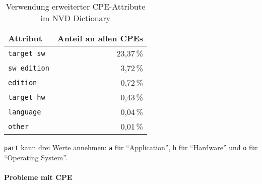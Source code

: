 \begin{table}[h]
    \centering
    \begin{tabular}{lr}
        \toprule
        \textbf{Attribut}   & \textbf{Anteil an allen CPEs} \\
        \midrule
        \texttt{target sw}  & 23{,}37\,\%                   \\
        \texttt{sw edition} & 3{,}72\,\%                    \\
        \texttt{edition}    & 0{,}72\,\%                    \\
        \texttt{target hw}  & 0{,}43\,\%                    \\
        \texttt{language}   & 0{,}04\,\%                    \\
        \texttt{other}      & 0{,}01\,\%                    \\
        \bottomrule
    \end{tabular}
    \caption{Verwendung erweiterter CPE-Attribute im NVD Dictionary}
    \label{tab:cpe-attribute-verteilung}
\end{table}


\texttt{part} kann drei Werte annehmen: \texttt{a} für \enquote{Application}, \texttt{h} für \enquote{Hardware} und \texttt{o} für \enquote{Operating System}.

\paragraph{Probleme mit CPE}


